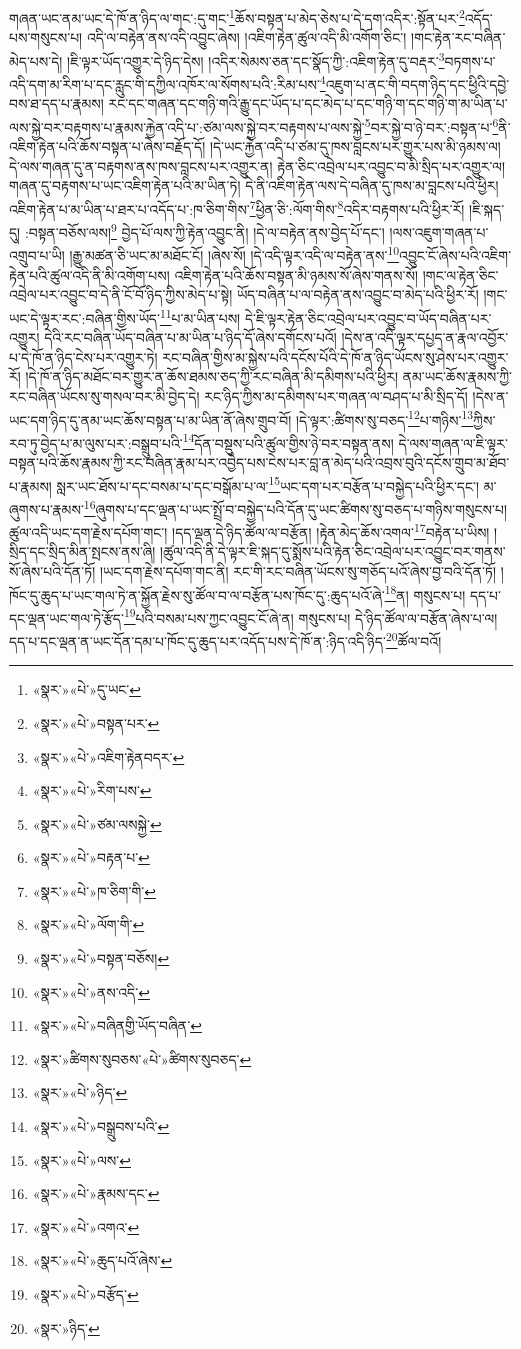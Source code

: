 གཞན་ཡང་ནམ་ཡང་དེ་ཁོ་ན་ཉིད་ལ་གང་:དུ་གང་\footnote{«སྣར་»«པེ་»དུ་ཡང་}ཆོས་བསྟན་པ་མེད་ཅེས་པ་དེ་དག་འདིར་:སྟོན་པར་\footnote{«སྣར་»«པེ་»བསྟན་པར་}འདོད་པས་གསུངས་པ། འདི་ལ་བརྟེན་ནས་འདི་འབྱུང་ཞེས། །འཇིག་རྟེན་ཚུལ་འདི་མི་འགོག་ཅིང་། །གང་རྟེན་རང་བཞིན་མེད་པས་དེ། །ཇི་ལྟར་ཡོད་འགྱུར་དེ་ཉིད་དེས། །འདིར་སེམས་ཅན་དང་སྣོད་ཀྱི་:འཇིག་རྟེན་དུ་བརྡར་\footnote{«སྣར་»«པེ་»འཇིག་རྟེནབདར་}བཏགས་པ་འདི་དག་མ་རིག་པ་དང་རླུང་གི་དཀྱིལ་འཁོར་ལ་སོགས་པའི་:རིམ་པས་\footnote{«སྣར་»«པེ་»རིག་པས་}འཇུག་པ་ནང་གི་བདག་ཉིད་དང་ཕྱིའི་དབྱེ་བས་ཐ་དད་པ་རྣམས། རང་དང་གཞན་དང་གཉི་གའི་རྒྱུ་དང་ཡོད་པ་དང་མེད་པ་དང་གཉི་ག་དང་གཉི་ག་མ་ཡིན་པ་ལས་སྐྱེ་བར་བརྟགས་པ་རྣམས་རྐྱེན་འདི་པ་:ཙམ་ལས་སྐྱེ་བར་བརྟགས་པ་ལས་སྐྱེ་\footnote{«སྣར་»«པེ་»ཙམ་ལསསྐྱེ་}བར་སྐྱེ་བ་ཉེ་བར་:བསྟན་པ་\footnote{«སྣར་»«པེ་»བརྟན་པ་}ནི་འཇིག་རྟེན་པའི་ཆོས་བསྟན་པ་ཞེས་བརྗོད་དོ། །དེ་ཡང་རྐྱེན་འདི་པ་ཙམ་དུ་ཁས་བླངས་པར་གྱུར་པས་མི་ཉམས་ལ། དེ་ལས་གཞན་དུ་ན་བརྟགས་ནས་ཁས་བླངས་པར་འགྱུར་ན། རྟེན་ཅིང་འབྲེལ་པར་འབྱུང་བ་མི་སྲིད་པར་འགྱུར་ལ། གཞན་དུ་བརྟགས་པ་ཡང་འཇིག་རྟེན་པའི་མ་ཡིན་ཏེ། དེ་ནི་འཇིག་རྟེན་ལས་དེ་བཞིན་དུ་ཁས་མ་བླངས་པའི་ཕྱིར། འཇིག་རྟེན་པ་མ་ཡིན་པ་ཐར་པ་འདོད་པ་:ཁ་ཅིག་གིས་\footnote{«སྣར་»«པེ་»ཁ་ཅིག་གི་}ཕྱིན་ཅི་:ལོག་གིས་\footnote{«སྣར་»«པེ་»ལོག་གི་}འདིར་བརྟགས་པའི་ཕྱིར་རོ། །ཇི་སྐད་དུ། :བསྟན་བཅོས་ལས།\footnote{«སྣར་»«པེ་»བསྟན་བཅོས།} བྱེད་པོ་ལས་ཀྱི་རྟེན་འབྱུང་ནི། །དེ་ལ་བརྟེན་ནས་བྱེད་པོ་དང་། །ལས་འཇུག་གཞན་པ་འགྲུབ་པ་ཡི། །རྒྱུ་མཚན་ཅི་ཡང་མ་མཐོང་ངོ། །ཞེས་སོ། །དེ་འདི་ལྟར་འདི་ལ་བརྟེན་ནས་\footnote{«སྣར་»«པེ་»ནས་འདི་}འབྱུང་ངོ་ཞེས་པའི་འཇིག་རྟེན་པའི་ཚུལ་འདི་ནི་མི་འགོག་པས། འཇིག་རྟེན་པའི་ཆོས་བསྟན་མི་ཉམས་སོ་ཞེས་གནས་སོ། །གང་ལ་རྟེན་ཅིང་འབྲེལ་པར་འབྱུང་བ་དེ་ནི་ངོ་བོ་ཉིད་ཀྱིས་མེད་པ་སྟེ། ཡོད་བཞིན་པ་ལ་བརྟེན་ནས་འབྱུང་བ་མེད་པའི་ཕྱིར་རོ། །གང་ཡང་དེ་ལྟར་རང་:བཞིན་གྱིས་ཡོད་\footnote{«སྣར་»«པེ་»བཞིནགྱི་ཡོད་བཞིན་}པ་མ་ཡིན་པས། དེ་ཇི་ལྟར་རྟེན་ཅིང་འབྲེལ་པར་འབྱུང་བ་ཡོད་བཞིན་པར་འགྱུར། དེའི་རང་བཞིན་ཡོད་བཞིན་པ་མ་ཡིན་པ་ཉིད་དོ་ཞེས་དགོངས་པའོ། །དེས་ན་འདི་ལྟར་དཔྱད་ན་རྣལ་འབྱོར་པ་དེ་ཁོ་ན་ཉིད་ངེས་པར་འགྱུར་ཏེ། རང་བཞིན་གྱིས་མ་སྐྱེས་པའི་དངོས་པོའི་དེ་ཁོ་ན་ཉིད་ཡོངས་སུ་ཤེས་པར་འགྱུར་རོ། །དེ་ཁོ་ན་ཉིད་མཐོང་བར་གྱུར་ན་ཆོས་ཐམས་ཅད་ཀྱི་རང་བཞིན་མི་དམིགས་པའི་ཕྱིར། ནམ་ཡང་ཆོས་རྣམས་ཀྱི་རང་བཞིན་ཡོངས་སུ་གསལ་བར་མི་བྱེད་དེ། རང་ཉིད་ཀྱིས་མ་དམིགས་པར་གཞན་ལ་བཤད་པ་མི་སྲིད་དོ། །དེས་ན་ཡང་དག་ཉིད་དུ་ནམ་ཡང་ཆོས་བསྟན་པ་མ་ཡིན་ནོ་ཞེས་གྲུབ་བོ། །དེ་ལྟར་:ཚིགས་སུ་བཅད་\footnote{«སྣར་»ཚིགས་སུབཅས་«པེ་»ཚིགས་སུབཅད་}པ་གཉིས་\footnote{«སྣར་»«པེ་»ཉིད་}ཀྱིས་རབ་ཏུ་བྱེད་པ་མ་ལུས་པར་:བསྒྲུབ་པའི་\footnote{«སྣར་»«པེ་»བསྒྲུབས་པའི་}དོན་བསྡུས་པའི་ཚུལ་གྱིས་ཉེ་བར་བསྟན་ནས། དེ་ལས་གཞན་ལ་ཇི་ལྟར་བསྟན་པའི་ཆོས་རྣམས་ཀྱི་རང་བཞིན་རྣམ་པར་འབྱེད་པས་ངེས་པར་བླ་ན་མེད་པའི་འབྲས་བུའི་དངོས་གྲུབ་མ་ཐོབ་པ་རྣམས། སླར་ཡང་ཐོས་པ་དང་བསམ་པ་དང་བསྒོམ་པ་ལ་\footnote{«སྣར་»«པེ་»ལས་}ཡང་དག་པར་བརྩོན་པ་བསྐྱེད་པའི་ཕྱིར་དང་། མ་ཞུགས་པ་རྣམས་\footnote{«སྣར་»«པེ་»རྣམས་དང་}ཞུགས་པ་དང་ལྡན་པ་ཡང་སྤྲོ་བ་བསྐྱེད་པའི་དོན་དུ་ཡང་ཚིགས་སུ་བཅད་པ་གཉིས་གསུངས་པ། ཚུལ་འདི་ཡང་དག་རྗེས་དཔོག་གང་། །དད་ལྡན་དེ་ཉིད་ཚོལ་ལ་བརྩོན། །རྟེན་མེད་ཆོས་འགལ་\footnote{«སྣར་»«པེ་»འགའ་}བརྟེན་པ་ཡིས། །སྲིད་དང་སྲིད་མིན་སྤངས་ནས་ཞི། །ཚུལ་འདི་ནི་དེ་ལྟར་ཇི་སྐད་དུ་སྨོས་པའི་རྟེན་ཅིང་འབྲེལ་པར་འབྱུང་བར་གནས་སོ་ཞེས་པའི་དོན་ཏོ། །ཡང་དག་རྗེས་དཔོག་གང་ནི། རང་གི་རང་བཞིན་ཡོངས་སུ་གཅོད་པའོ་ཞེས་བྱ་བའི་དོན་ཏོ། །ཁོང་དུ་ཆུད་པ་ཡང་གལ་ཏེ་ན་སྐྱོན་རྗེས་སུ་ཚོལ་བ་ལ་བརྩོན་པས་ཁོང་དུ་:ཆུད་པའོ་ཞེ་\footnote{«སྣར་»«པེ་»ཆུད་པའོ་ཞེས་}ན། གསུངས་པ། དད་པ་དང་ལྡན་ཡང་གལ་ཏེ་རྩོད་\footnote{«སྣར་»«པེ་»བརྩོད་}པའི་བསམ་པས་ཀྱང་འབྱུང་ངོ་ཞེ་ན། གསུངས་པ། དེ་ཉིད་ཚོལ་ལ་བརྩོན་ཞེས་པ་ལ། དད་པ་དང་ལྡན་ན་ཡང་དོན་དམ་པ་ཁོང་དུ་ཆུད་པར་འདོད་པས་དེ་ཁོ་ན་:ཉིད་འདི་ཉིད་\footnote{«སྣར་»ཉིད་}ཚོལ་བའོ། 